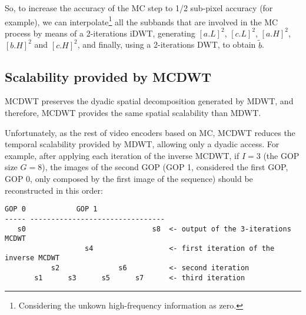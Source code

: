 So, to increase the accuracy of the MC step to 1/2 sub-pixel accuracy
(for example), we can interpolate\footnote{Considering the unkown
  high-frequency information as zero.} all the subbands that are
involved in the MC process by means of a 2-iterations iDWT, generating
$[a.L]^2$, $[c.L]^2$, $[a.H]^2$, $[b.H]^2$ and $[c.H]^2$, and finally,
using a 2-iterations DWT, to obtain $\tilde{b}$.

\subsection{Scalability provided by MCDWT}
MCDWT preserves the dyadic spatial decomposition generated by MDWT,
and therefore, MCDWT provides the same spatial scalability than MDWT.

Unfortunately, as the rest of video encoders based on MC, MCDWT
reduces the temporal scalability provided by MDWT, allowing only a
dyadic access. For example, after applying each iteration of the
inverse MCDWT, if $I=3$ (the GOP size $G=8$), the images of the second
GOP (GOP 1, considered the first GOP, GOP 0, only composed by the
first image of the sequence) should be reconstructed in this order:

\begin{verbatim}
GOP 0            GOP 1
----- --------------------------------
   s0                              s8  <- output of the 3-iterations MCDWT
                   s4                  <- first iteration of the inverse MCDWT
           s2              s6          <- second iteration
       s1      s3      s5      s7      <- third iteration
\end{verbatim}



